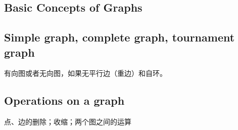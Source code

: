 \documentclass[11pt,fleqn]{book} %
\def\R{\mathbb{R}}
\begin{document}
\begin{CJK}{UTF8}{gkai}

\chapter{Basic Concepts of Graphs}

\section{Simple graph, complete graph, tournament graph}
\begin{definition}
 有向图或者无向图，如果无平行边（重边）和自环。
\end{definition}

\section{Operations on a graph}
点、边的删除；收缩；两个图之间的运算


\end{CJK}
\end{document}

